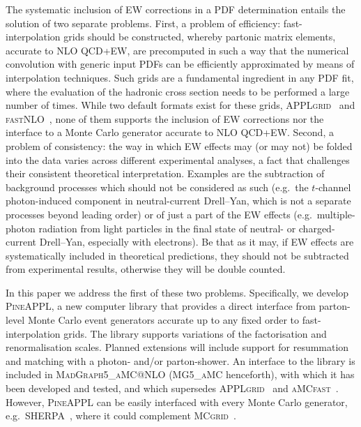 The systematic inclusion of EW corrections in a PDF determination entails
the solution of two separate problems. First, a problem of efficiency:
fast-interpolation grids should be constructed, whereby partonic matrix 
elements, accurate to NLO QCD+EW, are precomputed in such a way that the 
numerical convolution with generic input PDFs can be efficiently approximated
by means of interpolation techniques. Such grids are a fundamental ingredient
in any PDF fit, where the evaluation of the hadronic cross section needs to 
be performed a large number of times. While two default formats exist for
these grids, \textsc{APPLgrid}~\cite{Carli:2010rw} and
\textsc{fastNLO}~\cite{Kluge:2006xs}, none of them supports the inclusion of EW
corrections nor the interface to a Monte Carlo generator accurate to 
NLO QCD+EW\@. Second, a problem of consistency: the way in which EW effects may
(or may not) be folded into the data varies across different experimental 
analyses, a fact that challenges their consistent theoretical interpretation. 
Examples are the subtraction of background processes which should not be 
considered as such (e.g.\ the $t$-channel photon-induced component in
neutral-current Drell--Yan, which is not a separate processes beyond leading
order) or of just a part of the EW effects (e.g.\ multiple-photon
radiation from light particles in the final state of neutral- or charged-current
Drell--Yan, especially with electrons). Be that as it may, if EW effects are
systematically included in theoretical predictions, they should not be subtracted
from experimental results, otherwise they will be double counted.

In this paper we address the first of these two problems. Specifically, 
we develop \textsc{PineAPPL}, a new computer library that provides a direct interface
from parton-level Monte Carlo event generators accurate up to any fixed order to
fast-interpolation grids. The library supports variations of the factorisation
and renormalisation scales. Planned extensions will include support for resummation and matching with a photon- and/or
parton-shower. An interface to the library is included in
\textsc{MadGraph5\_aMC@NLO} (\textsc{MG5\_aMC} henceforth), with which it has
been developed and tested, and which supersedes \textsc{APPLgrid}~\cite{Carli:2010rw} and \textsc{aMCfast}~\cite{Bertone:2014zva}.
However, \textsc{PineAPPL} can be easily interfaced with every
Monte Carlo generator, e.g.\ \textsc{SHERPA}~\cite{Biedermann:2017yoi}, where it could complement \textsc{MCgrid}~\cite{DelDebbio:2013kxa,Bothmann:2015dba}.

